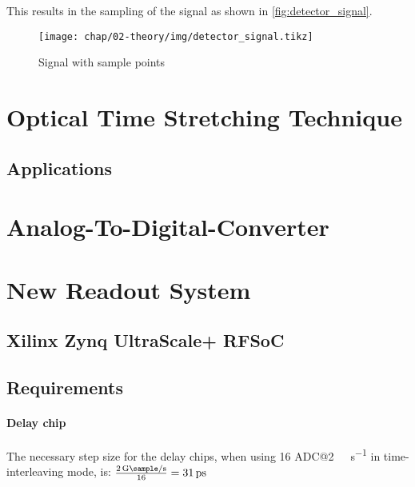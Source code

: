This results in the sampling of the signal as shown in \autoref{fig:detector_signal}.
\begin{figure}[H]
	\centering
	\texttt{[image: chap/02-theory/img/detector\_signal.tikz]}
	\caption{Signal with sample points}
	\label{fig:detector_signal}
\end{figure}


\newpage 
\section{Optical Time Stretching Technique}
\subsection{Applications}

\newpage
\section{Analog-To-Digital-Converter}

\newpage

\section{New Readout System}
\subsection{Xilinx Zynq UltraScale+ RFSoC}
\subsection{Requirements}

\paragraph{Delay chip}
The necessary step size for the delay chips, when using 16 ADC@\SI{2}{\giga \sample \per \second} in time-interleaving mode, is: $\frac{\SI{2}{\giga \sample \per \second}}{16} = \SI{31}{\pico \second}$




